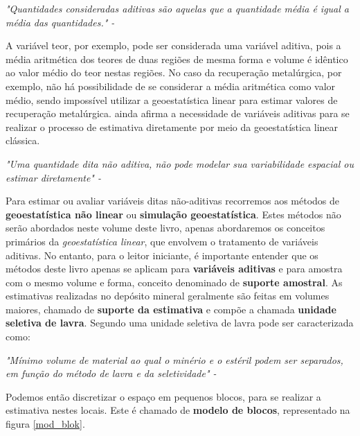 \FloatBarrier
\begin{remark}	
	\textit{"Quantidades consideradas aditivas são aquelas que a quantidade média é igual a média das quantidades." - \cite{carrasco2008additivity}} 
\end{remark}
\FloatBarrier

A variável teor, por exemplo, pode ser considerada uma variável aditiva, pois a média aritmética dos teores de duas regiões de mesma forma e volume é idêntico ao valor médio do teor nestas regiões. No caso da recuperação metalúrgica, por exemplo, não há possibilidade de se considerar a média aritmética como valor médio, sendo impossível utilizar a geoestatística linear para estimar valores de recuperação metalúrgica. \citet{carrasco2008additivity} ainda afirma a necessidade de variáveis aditivas para se realizar o processo de estimativa diretamente por meio da geoestatística linear clássica. 

\FloatBarrier
\begin{remark}	
	\textit{"Uma quantidade dita não aditiva, não pode modelar sua variabilidade espacial ou estimar diretamente" - \cite{carrasco2008additivity}} 
\end{remark}
\FloatBarrier

Para estimar ou avaliar variáveis ditas não-aditivas recorremos aos métodos de \textbf{geoestatística não linear} ou \textbf{simulação geoestatística}. Estes métodos não serão abordados neste volume deste livro, apenas abordaremos os conceitos primários da \textit{geoestatística linear}, que envolvem o tratamento de variáveis aditivas. No entanto, para o leitor iniciante, é importante entender que os métodos deste livro apenas se aplicam para \textbf{variáveis aditivas} e para amostra com o mesmo volume e forma, conceito denominado de \textbf{suporte amostral}. As estimativas realizadas no depósito mineral geralmente são feitas em volumes maiores, chamado de \textbf{suporte da estimativa} e compõe a chamada \textbf{unidade seletiva de lavra}. Segundo \citet{rossi2013mineral} uma unidade seletiva de lavra pode ser caracterizada como:

\FloatBarrier
\begin{remark}	
	\textit{"Mínimo volume de material ao qual o minério e o estéril podem ser separados, em função do método de lavra e da seletividade" - \cite{rossi2013mineral}} 
\end{remark}
\FloatBarrier

Podemos então discretizar o espaço em pequenos blocos, para se realizar a estimativa nestes locais. Este é chamado de \textbf{modelo de blocos}, representado na figura \ref{mod_blok}.

